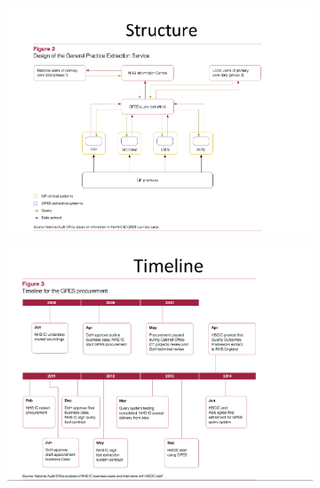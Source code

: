 \documentclass[a4paper]{report}
\begin{document}
\begin{figure}[H]
\centering
\begin{subfigure}{1\textwidth}
  \includegraphics[width=1\linewidth]
  {images/1-structure.png}
\end{subfigure}
\end{figure}

\begin{figure}[H]
\centering
\begin{subfigure}{1\textwidth}
  \includegraphics[width=1\linewidth]
  {images/1-timeline.png}
\end{subfigure}
\end{figure}
\end{document}
